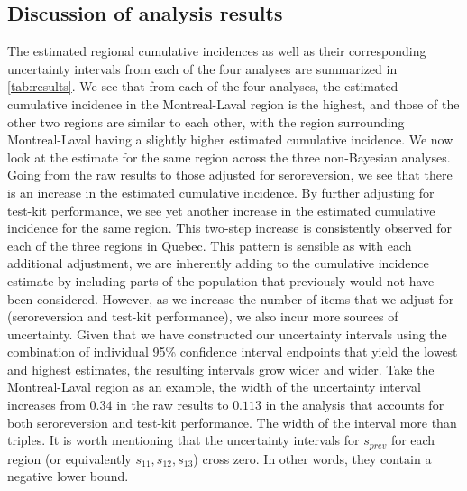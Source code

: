 \subsection{Discussion of analysis results}
The estimated regional cumulative incidences as well as their corresponding uncertainty intervals from each of the four analyses are summarized in \cref{tab:results}. We see that from each of the four analyses, the estimated cumulative incidence in the Montreal-Laval region is the highest, and those of the other two regions are similar to each other, with the region surrounding Montreal-Laval having a slightly higher estimated cumulative incidence. We now look at the estimate for the same region across the three non-Bayesian analyses. Going from the raw results to those adjusted for seroreversion, we see that there is an increase in the estimated cumulative incidence. By further adjusting for test-kit performance, we see yet another increase in the estimated cumulative incidence for the same region. This two-step increase is consistently observed for each of the three regions in Quebec. This pattern is sensible as with each additional adjustment, we are inherently adding to the cumulative incidence estimate by including parts of the population that previously would not have been considered. However, as we increase the number of items that we adjust for (seroreversion and test-kit performance), we also incur more sources of uncertainty. Given that we have constructed our uncertainty intervals using the combination of individual 95\% confidence interval endpoints that yield the lowest and highest estimates, the resulting intervals grow wider and wider. Take the Montreal-Laval region as an example, the width of the uncertainty interval increases from $0.34$ in the raw results to $0.113$ in the analysis that accounts for both seroreversion and test-kit performance. The width of the interval more than triples. It is worth mentioning that the uncertainty intervals for $s_{prev}$ for each region (or equivalently $s_{11}, s_{12}, s_{13}$) cross zero. In other words, they contain a negative lower bound.\\
\newline$ $
